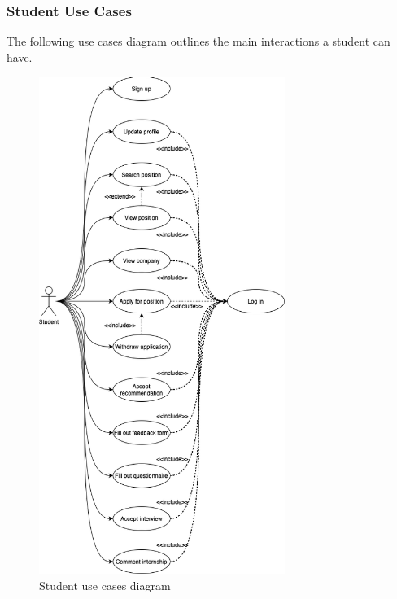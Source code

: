 
\clearpage
\subsubsection{Student Use Cases}
The following use cases diagram outlines the main interactions a student can have.

\begin{figure}[h]
    \centering
    \includegraphics[width=8cm]{images/use-cases-diagrams/student.png}
    \caption{Student use cases diagram}
\end{figure}

